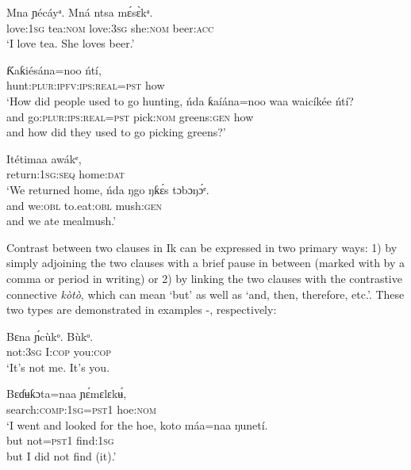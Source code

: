 \ea\label{ex:syn:61}
\gll M{\Í}n{\Í}a     ɲécáyᵃ.   M{\Í}ná       ntsa   m\'{ɛ}s\`{ɛ}kᵃ. \\
love:\textsc{1sg}   tea:\textsc{nom}   love:\textsc{3sg} she:\textsc{nom}   beer:\textsc{acc}    \\
\glt ‘I love tea. She loves beer.’ 
\z




\ea\label{ex:syn:62}
  \ea
  \gll Ƙaƙiésána=noo       ńtí, \\
hunt:\textsc{plur:ipfv:ips:real=pst}   how \\
  \glt ‘How did people used to go hunting,
  \medskip
  \ex
  \gll ńda   ƙaíána=noo         waa   waicíkée     ńtí?  \\
     and   go:\textsc{plur:ips:real=pst} pick:\textsc{nom} greens:\textsc{gen} how  \\
  \glt and how did they used to go picking greens?’
  \z
\z




\ea\label{ex:syn:63}
  \ea
  \gll Itétimaa awákᵉ, \\
return:\textsc{1sg:seq} home:\textsc{dat}     \\
  \glt ‘We returned home, 
  \medskip
  \ex
  \gll ńda  ŋgo     ŋƙ\'{ɛ}s{\Í}     tɔbɔŋ\'{ɔ}ᵉ. \\
and   we:\textsc{obl}   to.eat:\textsc{obl}   mush:\textsc{gen}    \\
  \glt and we ate mealmush.’
  \z
\z

Contrast between two clauses in Ik can be expressed in two primary ways: 1) by simply adjoining the two clauses with a brief pause in between (marked with by a comma or period in writing) or 2) by linking the two clauses with the contrastive connective \textit{kòtò}, which can mean ‘but’ as well as ‘and, then, therefore, etc.’. These two types are demonstrated in examples -, respectively:



\ea\label{ex:syn:64}
\gll Bɛna     \'{ɲ}cùkᵒ.     Bùkᵒ. \\
not:\textsc{3sg}   I:\textsc{cop}     you:\textsc{cop}    \\
\glt ‘It’s not me. It’s you. 
\z




\ea\label{ex:syn:65}
  \ea
  \gll Bɛɗʉƙɔt{\Í}a=naa     ɲ\'{ɛ}mɛlɛk\'{ʉ}, \\
search:\textsc{comp:1sg=pst1}   hoe:\textsc{nom}    \\
  \glt ‘I went and looked for the hoe, 
  \medskip
  \ex
  \gll koto   máa=naa   ŋunetí. \\
but   not=\textsc{pst1}   find:\textsc{1sg}    \\
  \glt but I did not find (it).’
  \z 
\z

